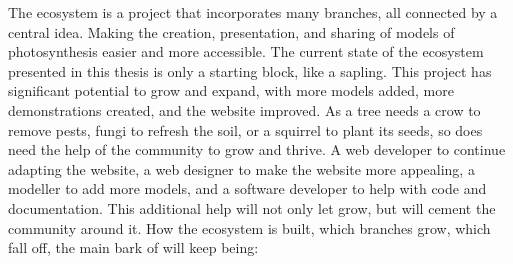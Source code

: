 The \greensloth{} ecosystem is a project that incorporates many branches, all connected by a central idea. Making the creation, presentation, and sharing of models of photosynthesis easier and more accessible. The current state of the ecosystem presented in this thesis is only a starting block, like a sapling. This project has significant potential to grow and expand, with more models added, more demonstrations created, and the website improved. As a tree needs a crow to remove pests, fungi to refresh the soil, or a squirrel to plant its seeds, so does \greensloth{} need the help of the community to grow and thrive. A web developer to continue adapting the website, a web designer to make the website more appealing, a modeller to add more models, and a software developer to help with code and documentation. This additional help will not only let \greensloth{} grow, but will cement the community around it. How the ecosystem is built, which branches grow, which fall off, the main bark of \greensloth{} will keep being:

\begin{center}
    \Large
\end{center}